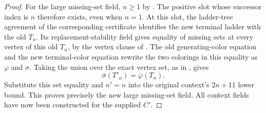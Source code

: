 \begin{proof}
For the large missing-set field, $n\ge1$ by
. The positive slot whose successor index
is $n$ therefore exists, even when $n=1$. At this slot, the ladder-tree
agreement of the corresponding certificate identifies the new terminal
ladder with the old $T_n$. Its replacement-stability field gives equality
of missing sets at every vertex of this old $T_n$, by the vertex clause
of . The old generating-color equation and the
new terminal-color equation rewrite the two colorings in this equality
as $\varphi$ and $\sigma$. Taking the union over the exact vertex set,
as in , gives
\[
 \overline\sigma(T'_n)=\overline\varphi(T_n).
\]
Substitute this set equality and $n'=n$ into the original context's
$2n+11$ lower bound. This proves precisely the new large missing-set field.
All context fields have now been constructed for the supplied $C'$.
\end{proof}
